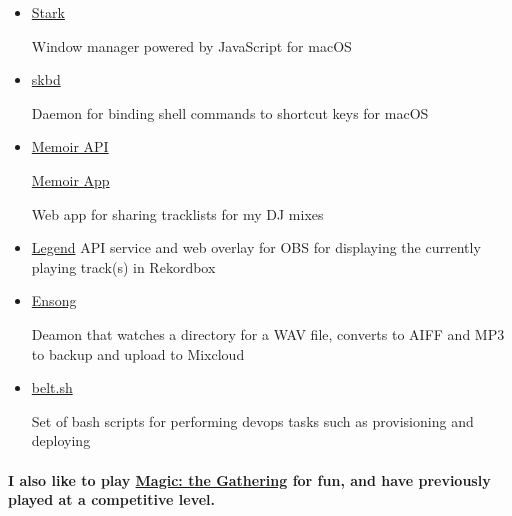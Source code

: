 \documentclass[a4paper]{article}
\newcommand{\languagetag}[1]{
  \raisebox{0.3\height}{\tiny #1}
}
\begin{document}
\begin{itemize}
  \item \href{https://github.com/starkwm/stark}{Stark} \languagetag{(Swift)}
    Window manager powered by JavaScript for macOS
  \item \href{https://github.com/starkwm/skbd}{skbd} \languagetag{(Swift)}
    Daemon for binding shell commands to shortcut keys for macOS
  \item \href{https://github.com/tombell/memoir}{Memoir API} \languagetag{(Go)}
    \href{https://github.com/tombell/memoir-app}{Memoir App}
    \languagetag{(TypeScript, Preact)} Web app for sharing tracklists for my DJ
    mixes
  \item \href{https://github.com/tombell/legend}{Legend} \languagetag{(Go,
    TypeScript, Preact)} API service and web overlay for OBS for displaying the
    currently playing track(s) in Rekordbox
  \item \href{https://github.com/tombell/ensong}{Ensong} \languagetag{(Go)}
    Deamon that watches a directory for a WAV file, converts to AIFF and MP3 to
    backup and upload to Mixcloud
  \item \href{https://github.com/belt-project/belt.sh}{belt.sh}
    \languagetag{(Bash)} Set of bash scripts for performing devops tasks such as
    provisioning and deploying
\end{itemize}

\paragraph{I also like to play \href{https://magic.wizards.com/en}{Magic: the
Gathering} for fun, and have previously played at a competitive level.}
\end{document}
